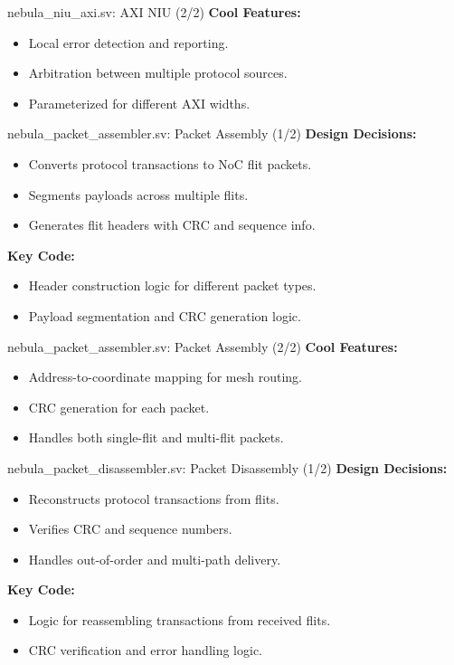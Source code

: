 \documentclass{beamer}
\begin{document}
\begin{frame}{nebula\_niu\_axi.sv: AXI NIU (2/2)}
  \textbf{Cool Features:}
  \begin{itemize}
    \item Local error detection and reporting.
    \item Arbitration between multiple protocol sources.
    \item Parameterized for different AXI widths.
  \end{itemize}
\end{frame}

\begin{frame}{nebula\_packet\_assembler.sv: Packet Assembly (1/2)}
  \textbf{Design Decisions:}
  \begin{itemize}
    \item Converts protocol transactions to NoC flit packets.
    \item Segments payloads across multiple flits.
    \item Generates flit headers with CRC and sequence info.
  \end{itemize}
  \textbf{Key Code:}
  \begin{itemize}
    \item Header construction logic for different packet types.
    \item Payload segmentation and CRC generation logic.
  \end{itemize}
\end{frame}

\begin{frame}{nebula\_packet\_assembler.sv: Packet Assembly (2/2)}
  \textbf{Cool Features:}
  \begin{itemize}
    \item Address-to-coordinate mapping for mesh routing.
    \item CRC generation for each packet.
    \item Handles both single-flit and multi-flit packets.
  \end{itemize}
\end{frame}

\begin{frame}{nebula\_packet\_disassembler.sv: Packet Disassembly (1/2)}
  \textbf{Design Decisions:}
  \begin{itemize}
    \item Reconstructs protocol transactions from flits.
    \item Verifies CRC and sequence numbers.
    \item Handles out-of-order and multi-path delivery.
  \end{itemize}
  \textbf{Key Code:}
  \begin{itemize}
    \item Logic for reassembling transactions from received flits.
    \item CRC verification and error handling logic.
  \end{itemize}
\end{frame}
\end{document}
